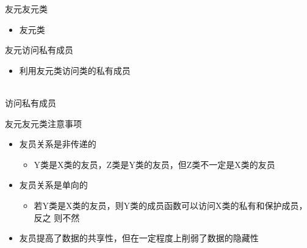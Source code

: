 \begin{frame}[t, fragile]{友元}{友元类}%
  \begin{itemize}
  \item 友元类
  \end{itemize}
  \begin{center}
    \begin{minipage}{0.45\linewidth}
    \end{minipage}\quad
    \begin{minipage}{0.48\linewidth}
    \end{minipage}
  \end{center}
\end{frame}

\begin{frame}[t, fragile]{友元}{访问私有成员}%
  \begin{itemize}
  \item 利用友元类访问类的私有成员
  \end{itemize}
  \begin{center}
    \begin{minipage}{0.6\linewidth}
    \end{minipage}
    \tiny \\ \vspace{4ex}
    \alert{访问私有成员}\\
  \end{center}
\end{frame}

\begin{frame}[t, fragile]{友元}{友元类注意事项}%
  \stretchon
  \begin{itemize}
  \item 友员关系是非传递的
    \begin{itemize}
    \item Y类是X类的友员，Z类是Y类的友员，但Z类不一定是X类的友员
    \end{itemize}
  \item 友员关系是单向的
    \begin{itemize}
    \item 若Y类是X类的友员，则Y类的成员函数可以访问X类的私有和保护成员，反之
    则不然
    \end{itemize}   
  \item 友员提高了数据的共享性，但在一定程度上削弱了数据的隐藏性
  \end{itemize}
  \stretchoff
\end{frame}

